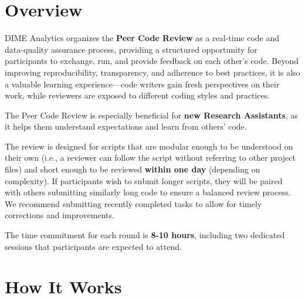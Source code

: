 \documentclass{tufte-handout}
\begin{document}
\thispagestyle{firstpage}
	\begin{fullwidth}


\section*{Overview}
DIME Analytics organizes the \textbf{Peer Code Review} as a real-time code and data-quality assurance process, providing a structured opportunity for participants to exchange, run, and provide feedback on each other's code. Beyond improving reproducibility, transparency, and adherence to best practices, it is also a valuable learning experience—code writers gain fresh perspectives on their work, while reviewers are exposed to different coding styles and practices.

\vspace{5mm}
\noindent The Peer Code Review is especially beneficial for \textbf{new Research Assistants}, as it helps them understand expectations and learn from others' code.

\vspace{5mm}
\noindent The review is designed for scripts that are modular enough to be understood on their own (i.e., a reviewer can follow the script without referring to other project files) and short enough to be reviewed \textbf{within one day} (depending on complexity). If participants wish to submit longer scripts, they will be paired with others submitting similarly long code to ensure a balanced review process. We recommend submitting recently completed tasks to allow for timely corrections and improvements.

\vspace{5mm}
\noindent The time commitment for each round is \textbf{8-10 hours}, including two dedicated sessions that participants are expected to attend.

\section*{How It Works}


\end{fullwidth}
\end{document}
